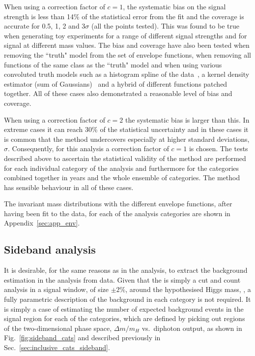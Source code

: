 When using a correction factor of $c=1$, the systematic bias on the signal strength is less than 14\% of the statistical error from the fit and the coverage is accurate for 0.5, 1, 2 and 3$\sigma$ (all the points tested). This was found to be true when generating toy experiments for a range of different signal strengths and for signal at different mass values. The bias and coverage have also been tested when removing the ``truth" model from the set of envelope functions, when removing all functions of the same class as the ``truth" model and when using various convoluted truth models such as a histogram spline of the data~\cite{regression_spline}, a kernel density estimator (sum of Gaussians)~\cite{kde} and a hybrid of different functions patched together. All of these cases also demonstrated a reasonable level of bias and coverage. 

When using a correction factor of $c=2$ the systematic bias is larger than this. In extreme cases it can reach 30\% of the statistical uncertainty and in these cases it is common that the method undercovers especially at higher standard deviations, $\sigma$. Consequently, for this analysis a correction factor of $c=1$ is chosen. The tests described above to ascertain the statistical validity of the method are performed for each individual category of the analysis and furthermore for the categories combined together in years and the whole ensemble of categories. The method has sensible behaviour in all of these cases.

The invariant mass distributions with the different envelope functions, after having been fit to the data, for each of the analysis categories are shown in Appendix~\ref{sec:app_env}. %

\subsection{Sideband analysis}

It is desirable, for the same reasons as in the \MFM analysis, to extract the background estimation in the \SMVA analysis from data. Given that the \SMVA is simply a cut and count analysis in a signal window, of size $\pm2\%$, around the hypothesised Higgs mass, \mH, a fully parametric description of the background in each category is not required. It is simply a case of estimating the number of expected background events in the signal region for each of the \SMVA categories, which are defined by picking out regions of the two-dimensional phase space, $\Delta m/m_{H}$ vs.~diphoton \BDT output, as shown in Fig.~\ref{fig:sideband_cats} and described previously in Sec.~\ref{sec:inclusive_cats_sideband}.


